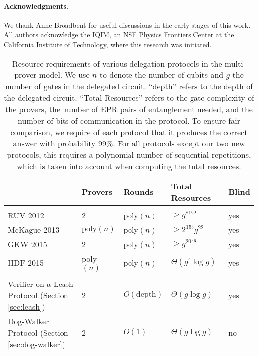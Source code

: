 \documentclass[11pt]{article}
\theoremstyle{remark}
\theoremstyle{definition}
\begin{document}
\paragraph{Acknowledgments.} We thank Anne Broadbent for useful discussions in the early stages of this work. All authors acknowledge the IQIM, an NSF Physics Frontiers Center at the California Institute of Technology, where this research was initiated. 

\begin{table}[H]
\centering
\begin{tabular}{l|llll}
& Provers & Rounds & Total Resources & Blind\\
\hline\\[-8pt]
RUV 2012 \cite{reichardt2012classical}  &2 & poly$(n)$ & $\geq g^{8192}$ & yes\\[3pt]
McKague 2013 \cite{McKague16} &  $\mathrm{poly}(n)$ & poly$(n)$ & $\geq 2^{153}g^{22}$ & yes \\[3pt]
GKW 2015 \cite{Gheorghiu15} &  2 & poly$(n)$ & $\geq g^{2048}$ & yes \\[3pt]
HDF 2015 \cite{hajdusek2015} &  poly$(n)$& poly$(n)$ & $\Theta(g^4\log g)$ & yes \\[3pt]
\hline\\[-8pt]
Verifier-on-a-Leash Protocol (Section \ref{sec:leash})   & 
2 & $O(\mbox{depth})$  & $\Theta(g\log g)$ & yes \\[3pt]
Dog-Walker Protocol (Section \ref{sec:dog-walker})  & 2 & $O(1)$ & $\Theta(g\log g)$ & no 
\end{tabular}
\caption{Resource requirements of various delegation protocols in the multi-prover model. 
We use $n$ to denote the number of qubits and $g$ the number of gates in the
  delegated circuit. ``depth'' refers to the depth of the delegated circuit. ``Total Resources'' refers to the gate complexity of the
  provers, the number of EPR pairs of entanglement needed, and the number of
  bits of communication in the protocol. To ensure fair comparison, we require
  of each protocol that it produces the correct answer with probability $99\%$.
  For all protocols except %
our two new protocols, this requires a
  polynomial number of sequential repetitions, which is taken into account when
  computing the total resources. %
}
\label{tab:comparison}
\end{table}
\end{document}
